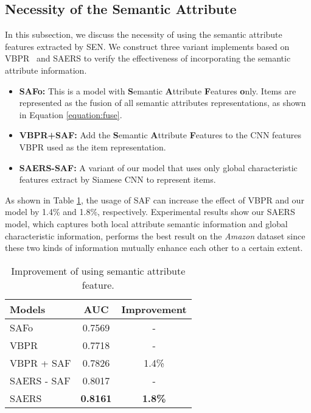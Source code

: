 \documentclass{article}
\begin{document}
\subsection{Necessity of the Semantic Attribute}
In this subsection, we discuss the necessity of using the semantic attribute features extracted by SEN. We construct three variant implements based on VBPR~\cite{he2016vbpr} and SAERS to verify the effectiveness of incorporating the semantic attribute information.
\begin{itemize}[leftmargin=*,itemsep=2.5pt]
		\setlength{\itemsep}{0pt}
	\setlength{\parsep}{0pt}
	\setlength{\parskip}{0pt}

    \item \textbf{SAFo:} This is a model with \textbf{S}emantic \textbf{A}ttribute \textbf{F}eatures \textbf{o}nly. Items are represented as the fusion of all semantic attributes representations, as shown in Equation \ref{equation:fuse}.
\item \textbf{VBPR+SAF:} Add the \textbf{S}emantic \textbf{A}ttribute \textbf{F}eatures to the CNN features VBPR used as the item representation.
    \item \textbf{SAERS-SAF:} A variant of our model that uses only global characteristic features extract by Siamese CNN to represent items.
\end{itemize}

As shown in Table \ref{table:attribute}, the usage of SAF can increase the effect of VBPR and our model by 1.4\% and 1.8\%, respectively. Experimental results show our SAERS model, which captures both local attribute semantic information and global characteristic information, performs the best result on the \textit{Amazon} dataset since these two kinds of information mutually enhance each other to a certain extent. 
\begin{table}[]
\begin{center}
\begin{tabular}{lcc}
\hline
Models     & AUC             & \multicolumn{1}{l}{Improvement} \\ \hline
SAFo       & 0.7569          & -                            \\
\hline
VBPR       & 0.7718          & -                               \\
VBPR + SAF & 0.7826          & 1.4\%                          \\ \hline
SAERS - SAF & 0.8017          & -                               \\
SAERS       & \textbf{0.8161} & \textbf{1.8\%}                  \\ \hline
\end{tabular}
\end{center}
\caption{Improvement of using semantic attribute feature.}\bigskip
\label{table:attribute}\end{table}
\end{document}
